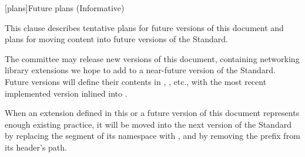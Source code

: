 
[plans]{Future plans (Informative)}

\pnum
This clause describes tentative plans for future versions of this document
and plans for moving content into future versions of the \Cpp Standard.

\pnum
The \Cpp committee may release new versions of this document,
containing networking library extensions we hope to add to a near-future
version of the \Cpp Standard. Future versions will define their contents
in , ,
etc., with the most recent implemented version inlined into
.

\pnum
When an extension defined in this or a future version of this document
represents enough existing practice, it will be moved into
the next version of the \Cpp Standard by replacing the
 segment of its namespace with ,
and by removing the  prefix from its header's path.


